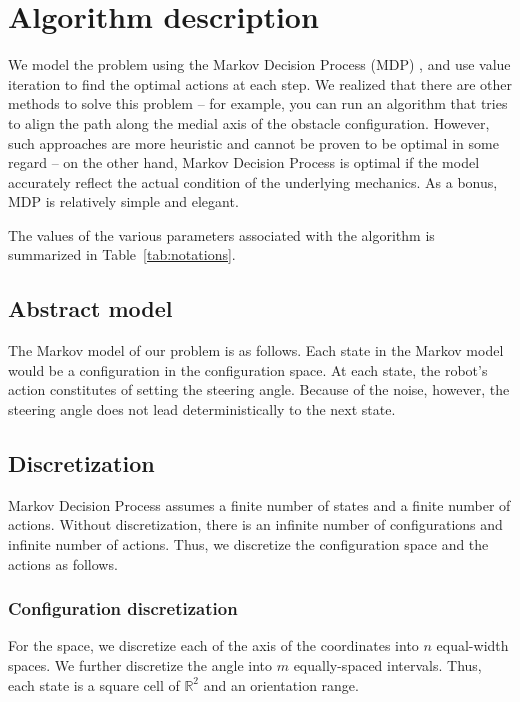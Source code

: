 \documentclass[10pt,a4paper,oneside]{article}
\begin{document}
\section{Algorithm description}
We model the problem using the Markov Decision Process (MDP) \cite{mdp},
and use value iteration
to find the optimal actions at each step. We realized that there are other
methods to solve this problem -- for example, you can run an algorithm that
tries to align the path along the medial axis of the obstacle configuration.
However, such approaches are more heuristic and cannot be proven to be
optimal in some regard -- on the other hand, Markov Decision Process is
optimal if the model accurately reflect the actual condition of the underlying
mechanics. As a bonus, MDP is relatively simple and elegant.

The values of the various parameters associated with the algorithm is
summarized in Table~\ref{tab:notations}.

\subsection{Abstract model}

The Markov model of our problem is as follows. Each state in the Markov model
would be a configuration in the configuration space. At each state, the robot's
action constitutes of setting the steering angle. Because of the noise, however,
the steering angle does not lead deterministically to the next state.

\subsection{Discretization}
Markov Decision Process assumes a finite number of states and a finite number
of actions. Without discretization, there is an infinite number of
configurations and infinite number of actions. Thus, we discretize the configuration
space and the actions as follows.

\subsubsection{Configuration discretization}
For the space, we discretize each of the axis of the coordinates into $n$
equal-width spaces. We further discretize the angle into $m$ equally-spaced
intervals. Thus, each state is a square cell of $\mathbb{R}^2$ and an orientation
range.
\end{document}
